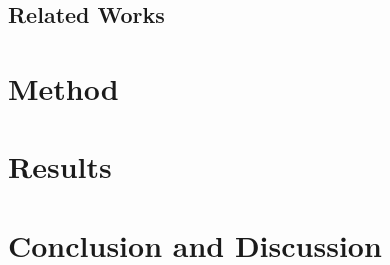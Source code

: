 \documentclass[12pt,
               a4,
               twoside,
               openright]{book} %
\begin{document}
    \section{Related Works}
    \label{sec:related}
        
    
    \chapter{Method}
    \chapter{Results}
    \chapter{Conclusion and Discussion}
    

    \backmatter


%    
%    

%    
%    


    
    

\end{document}
